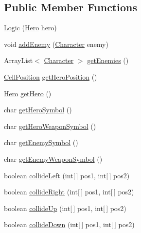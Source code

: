 \subsection*{Public Member Functions}
\begin{DoxyCompactItemize}
\item 
\hyperlink{classdkeep_1_1logic_1_1_logic_a3e2a7548a462e06de5852e39df402b48}{Logic} (\hyperlink{classdkeep_1_1logic_1_1_hero}{Hero} hero)
\item 
void \hyperlink{classdkeep_1_1logic_1_1_logic_ad52a9235db954ca4014550582c94aa50}{add\+Enemy} (\hyperlink{classdkeep_1_1logic_1_1_character}{Character} enemy)
\item 
Array\+List$<$ \hyperlink{classdkeep_1_1logic_1_1_character}{Character} $>$ \hyperlink{classdkeep_1_1logic_1_1_logic_a2f36d0e37683459a9d26925b66842efb}{get\+Enemies} ()
\item 
\hyperlink{classdkeep_1_1logic_1_1_cell_position}{Cell\+Position} \hyperlink{classdkeep_1_1logic_1_1_logic_a83397013032b9ff9b023b52d54e2a839}{get\+Hero\+Position} ()
\item 
\hyperlink{classdkeep_1_1logic_1_1_hero}{Hero} \hyperlink{classdkeep_1_1logic_1_1_logic_a69dc81092b0395e64b0f09e6c39a355a}{get\+Hero} ()
\item 
char \hyperlink{classdkeep_1_1logic_1_1_logic_a8629375c65c00b778f7bc927ad30da72}{get\+Hero\+Symbol} ()
\item 
char \hyperlink{classdkeep_1_1logic_1_1_logic_a31914ab092089708b8b1a788a90b5bfc}{get\+Hero\+Weapon\+Symbol} ()
\item 
char \hyperlink{classdkeep_1_1logic_1_1_logic_aec99013c9c1b9e5a52615752e1e0a4f2}{get\+Enemy\+Symbol} ()
\item 
char \hyperlink{classdkeep_1_1logic_1_1_logic_a73d73f30185c2a55b7bc9d3e743dc6bf}{get\+Enemy\+Weapon\+Symbol} ()
\item 
boolean \hyperlink{classdkeep_1_1logic_1_1_logic_a4e216fa33c4ed8fc48649d6cac3e5b7a}{collide\+Left} (int\mbox{[}$\,$\mbox{]} pos1, int\mbox{[}$\,$\mbox{]} pos2)
\item 
boolean \hyperlink{classdkeep_1_1logic_1_1_logic_af55798f2e54446a1df0ebed4319f78bf}{collide\+Right} (int\mbox{[}$\,$\mbox{]} pos1, int\mbox{[}$\,$\mbox{]} pos2)
\item 
boolean \hyperlink{classdkeep_1_1logic_1_1_logic_af2fb54584f4206e935755e4bc5afce81}{collide\+Up} (int\mbox{[}$\,$\mbox{]} pos1, int\mbox{[}$\,$\mbox{]} pos2)
\item 
boolean \hyperlink{classdkeep_1_1logic_1_1_logic_a8918f9ee21260104e05bf39c43782e70}{collide\+Down} (int\mbox{[}$\,$\mbox{]} pos1, int\mbox{[}$\,$\mbox{]} pos2)

\end{DoxyCompactItemize}
